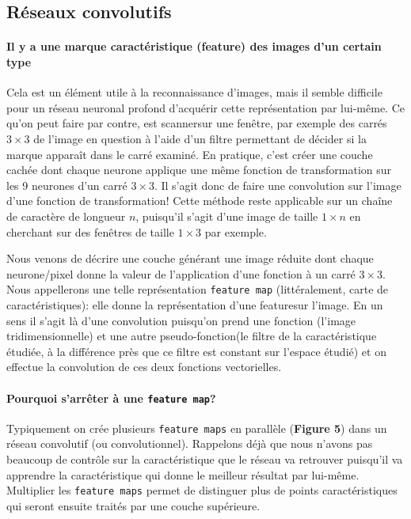 \documentclass[a4paper, 11pt, onecolumn]{article}
\begin{document}
\subsection{Réseaux convolutifs}

\paragraph{Il y a une marque caractéristique (feature) des images d'un certain type}

Cela est un élément utile à la reconnaissance d'images, mais il semble
difficile pour un réseau neuronal profond d'acquérir cette représentation par
lui-même. Ce qu'on peut faire par contre, est \og
scanner\fg sur une \og fenêtre\fg, par exemple des carrés $3\times 3$ de l'image en question à l'aide d'un filtre
permettant de décider si la marque apparaît dans le carré examiné. En pratique, c'est créer une couche cachée
dont chaque neurone applique une même fonction de transformation sur les 9 neurones d'un
carré $3\times 3$. Il s'agit donc de faire une convolution sur l'image d'une
fonction de transformation! Cette méthode reste applicable sur un chaîne de
caractère de longueur $n$, puisqu'il s'agit d'une image de taille $1\times n$ en
cherchant sur des fenêtres de taille $1\times 3$ par exemple.

Nous venons de décrire une couche générant une image réduite dont chaque
neurone/pixel donne la valeur de l'application d'une fonction à un carré
$3\times 3$. Nous appellerons une telle représentation \texttt{feature map}
(littéralement, carte de caractéristiques):
elle donne la représentation d'une \og feature\fg sur l'image. En un sens il
s'agit là d'une convolution puisqu'on prend une fonction (l'image
tridimensionnelle) et une autre \og pseudo-fonction\fg (le filtre de la
caractéristique étudiée, à la différence près que ce filtre est constant sur
l'espace étudié) et on effectue la convolution de ces deux fonctions
vectorielles.

\paragraph{Pourquoi s'arrêter à une \texttt{feature map}?}

Typiquement on crée plusieurs \texttt{feature maps} en parallèle (\textbf{Figure
5}) dans un réseau
convolutif (ou convolutionnel). Rappelons déjà que nous n'avons pas beaucoup de contrôle sur la
caractéristique que le réseau va retrouver puisqu'il va apprendre la
caractéristique qui donne le meilleur résultat par lui-même. Multiplier les
\texttt{feature maps} permet de distinguer plus de points caractéristiques qui
seront ensuite traités par une couche supérieure.
\end{document}
